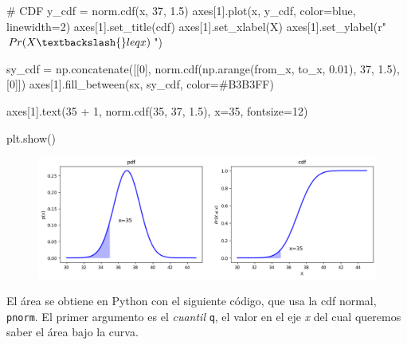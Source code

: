 \documentclass[
  letterpaper,
  DIV=11,
  numbers=noendperiod]{scrartcl}
\newenvironment{Shaded}{\begin{snugshade}}{\end{snugshade}}
\newcommand{\CommentTok}[1]{\textcolor[rgb]{0.37,0.37,0.37}{#1}}
\newcommand{\DecValTok}[1]{\textcolor[rgb]{0.68,0.00,0.00}{#1}}
\newcommand{\FloatTok}[1]{\textcolor[rgb]{0.68,0.00,0.00}{#1}}
\newcommand{\NormalTok}[1]{\textcolor[rgb]{0.00,0.23,0.31}{#1}}
\newcommand{\OperatorTok}[1]{\textcolor[rgb]{0.37,0.37,0.37}{#1}}
\newcommand{\StringTok}[1]{\textcolor[rgb]{0.13,0.47,0.30}{#1}}
\newcommand{\VerbatimStringTok}[1]{\textcolor[rgb]{0.13,0.47,0.30}{#1}}
\begin{document}
\begin{Shaded}
\begin{Highlighting}[]
\CommentTok{\# CDF}
\NormalTok{y\_cdf }\OperatorTok{=}\NormalTok{ norm.cdf(x, }\DecValTok{37}\NormalTok{, }\FloatTok{1.5}\NormalTok{)}
\NormalTok{axes[}\DecValTok{1}\NormalTok{].plot(x, y\_cdf, color}\OperatorTok{=}\StringTok{\textquotesingle{}blue\textquotesingle{}}\NormalTok{, linewidth}\OperatorTok{=}\DecValTok{2}\NormalTok{)}
\NormalTok{axes[}\DecValTok{1}\NormalTok{].set\_title(}\StringTok{\textquotesingle{}cdf\textquotesingle{}}\NormalTok{)}
\NormalTok{axes[}\DecValTok{1}\NormalTok{].set\_xlabel(}\StringTok{\textquotesingle{}X\textquotesingle{}}\NormalTok{)}
\NormalTok{axes[}\DecValTok{1}\NormalTok{].set\_ylabel(}\VerbatimStringTok{r"$Pr(X \textbackslash{}leq x)$"}\NormalTok{)}

\NormalTok{sy\_cdf }\OperatorTok{=}\NormalTok{ np.concatenate([[}\DecValTok{0}\NormalTok{], norm.cdf(np.arange(from\_x, to\_x, }\FloatTok{0.01}\NormalTok{), }\DecValTok{37}\NormalTok{, }\FloatTok{1.5}\NormalTok{), [}\DecValTok{0}\NormalTok{]])}
\NormalTok{axes[}\DecValTok{1}\NormalTok{].fill\_between(sx, sy\_cdf, color}\OperatorTok{=}\StringTok{\textquotesingle{}\#B3B3FF\textquotesingle{}}\NormalTok{)}

\NormalTok{axes[}\DecValTok{1}\NormalTok{].text(}\DecValTok{35} \OperatorTok{+} \DecValTok{1}\NormalTok{, norm.cdf(}\DecValTok{35}\NormalTok{, }\DecValTok{37}\NormalTok{, }\FloatTok{1.5}\NormalTok{), }\StringTok{\textquotesingle{}x=35\textquotesingle{}}\NormalTok{, fontsize}\OperatorTok{=}\DecValTok{12}\NormalTok{)}

\NormalTok{plt.show()}
\end{Highlighting}
\end{Shaded}

\begin{figure}[H]

{\centering \includegraphics{2.1_funciones_distribucion_densidad_files/figure-pdf/cell-14-output-1.png}

}

\end{figure}

El área se obtiene en Python con el siguiente código, que usa la cdf
normal, \texttt{pnorm}. El primer argumento es el \emph{cuantil}
\texttt{q}, el valor en el eje \emph{x} del cual queremos saber el área
bajo la curva.
\end{document}

